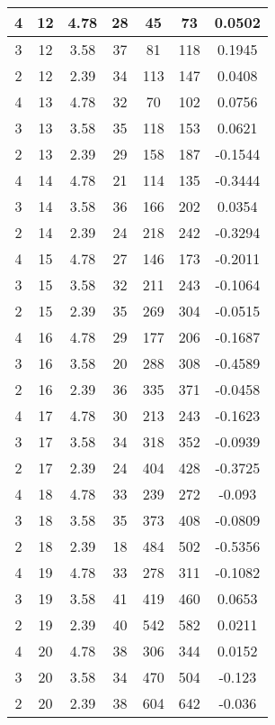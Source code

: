 \documentclass[letterpaper, 12pt]{article}
\begin{document}
\begin{longtable}{|c|c|c|c|c|c|c|}
\hline
4 & 12 & 4.78 & 28 & 45 & 73 & 0.0502 \\
\hline
3 & 12 & 3.58 & 37 & 81 & 118 & 0.1945 \\
\hline
2 & 12 & 2.39 & 34 & 113 & 147 & 0.0408 \\
\hline
4 & 13 & 4.78 & 32 & 70 & 102 & 0.0756 \\
\hline
3 & 13 & 3.58 & 35 & 118 & 153 & 0.0621 \\
\hline
2 & 13 & 2.39 & 29 & 158 & 187 & -0.1544 \\
\hline
4 & 14 & 4.78 & 21 & 114 & 135 & -0.3444 \\
\hline
3 & 14 & 3.58 & 36 & 166 & 202 & 0.0354 \\
\hline
2 & 14 & 2.39 & 24 & 218 & 242 & -0.3294 \\
\hline
4 & 15 & 4.78 & 27 & 146 & 173 & -0.2011 \\
\hline
3 & 15 & 3.58 & 32 & 211 & 243 & -0.1064 \\
\hline
2 & 15 & 2.39 & 35 & 269 & 304 & -0.0515 \\
\hline
4 & 16 & 4.78 & 29 & 177 & 206 & -0.1687 \\
\hline
3 & 16 & 3.58 & 20 & 288 & 308 & -0.4589 \\
\hline
2 & 16 & 2.39 & 36 & 335 & 371 & -0.0458 \\
\hline
4 & 17 & 4.78 & 30 & 213 & 243 & -0.1623 \\
\hline
3 & 17 & 3.58 & 34 & 318 & 352 & -0.0939 \\
\hline
2 & 17 & 2.39 & 24 & 404 & 428 & -0.3725 \\
\hline
4 & 18 & 4.78 & 33 & 239 & 272 & -0.093 \\
\hline
3 & 18 & 3.58 & 35 & 373 & 408 & -0.0809 \\
\hline
2 & 18 & 2.39 & 18 & 484 & 502 & -0.5356 \\
\hline
4 & 19 & 4.78 & 33 & 278 & 311 & -0.1082 \\
\hline
3 & 19 & 3.58 & 41 & 419 & 460 & 0.0653 \\
\hline
2 & 19 & 2.39 & 40 & 542 & 582 & 0.0211 \\
\hline
4 & 20 & 4.78 & 38 & 306 & 344 & 0.0152 \\
\hline
3 & 20 & 3.58 & 34 & 470 & 504 & -0.123 \\
\hline
2 & 20 & 2.39 & 38 & 604 & 642 & -0.036 \\
\hline
\end{longtable}
\end{document}

